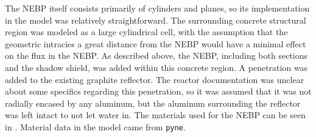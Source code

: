 The NEBP itself consists primarily of cylinders and planes, so its implementation in the model was relatively straightforward.
The surrounding concrete structural region was modeled as a large cylindrical cell, with the assumption that the geometric intracies a great distance from the NEBP would have a minimal effect on the flux in the NEBP.
As described above, the NEBP, including both sections and the shadow shield, was added within this concrete region.
A penetration was added to the existing graphite reflector.
The reactor documentation was unclear about some specifics regarding this penetration, so it was assumed that it was not radially encased by any aluminum, but the aluminum surrounding the reflector was left intact to not let water in.
The materials used for the NEBP can be seen in .
Material data in the model came from {\tt pyne}.



